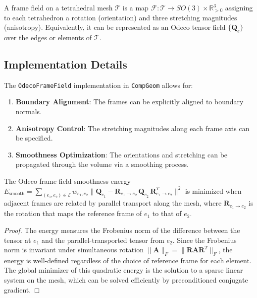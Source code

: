 \begin{definition}\label{def:frame_field}
A frame field on a tetrahedral mesh $\mathcal{T}$ is a map $\mathcal{F}: \mathcal{T} \to SO(3) \times \mathbb{R}_{>0}^3$ assigning to each tetrahedron a rotation (orientation) and three stretching magnitudes (anisotropy). Equivalently, it can be represented as an Odeco tensor field $\{\mathbf{Q}_e\}$ over the edges or elements of $\mathcal{T}$.
\end{definition}

\subsection{Implementation Details}
The \texttt{OdecoFrameField} implementation in \texttt{CompGeom} allows for:
\begin{enumerate}
  \item \textbf{Boundary Alignment}: The frames can be explicitly aligned to boundary normals.
  \item \textbf{Anisotropy Control}: The stretching magnitudes along each frame axis can be specified.
  \item \textbf{Smoothness Optimization}: The orientations and stretching can be propagated through the volume via a smoothing process.
\end{enumerate}

\begin{theorem}\label{thm:odeco_smoothness}
The Odeco frame field smoothness energy $E_{\text{smooth}} = \sum_{(e_1, e_2) \in \mathcal{E}} w_{e_1,e_2} \|\mathbf{Q}_{e_1} - \mathbf{R}_{e_1 \to e_2} \, \mathbf{Q}_{e_2} \, \mathbf{R}_{e_1 \to e_2}^T\|^2$ is minimized when adjacent frames are related by parallel transport along the mesh, where $\mathbf{R}_{e_1 \to e_2}$ is the rotation that maps the reference frame of $e_1$ to that of $e_2$.
\end{theorem}
\begin{proof}
The energy measures the Frobenius norm of the difference between the tensor at $e_1$ and the parallel-transported tensor from $e_2$. Since the Frobenius norm is invariant under simultaneous rotation $\|\mathbf{A}\|_F = \|\mathbf{R}\mathbf{A}\mathbf{R}^T\|_F$, the energy is well-defined regardless of the choice of reference frame for each element. The global minimizer of this quadratic energy is the solution to a sparse linear system on the mesh, which can be solved efficiently by preconditioned conjugate gradient.
\end{proof}


